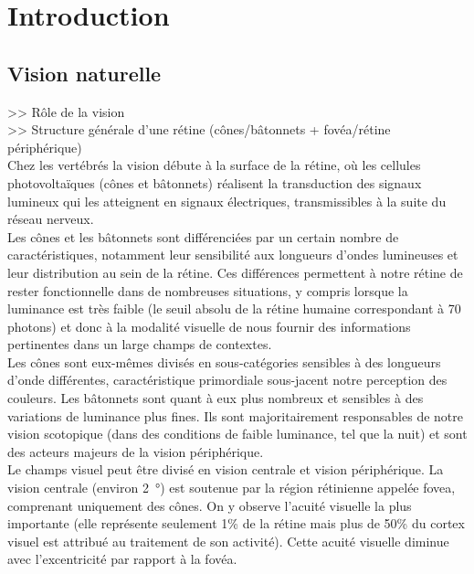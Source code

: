 
\chapter{Introduction} %

\label{Introduction} %


\newcommand{\keyword}[1]{\textbf{#1}}
\newcommand{\tabhead}[1]{\textbf{#1}}
\newcommand{\code}[1]{\texttt{#1}}
\newcommand{\file}[1]{\texttt{\bfseries#1}}
\newcommand{\option}[1]{\texttt{\itshape#1}}


\section{Vision naturelle}
>> Rôle de la vision\\

>> Structure générale d'une rétine (cônes/bâtonnets + fovéa/rétine périphérique)\\
Chez les vertébrés la vision débute à la surface de la rétine, où les cellules photovoltaïques (cônes et bâtonnets) réalisent la transduction des signaux lumineux qui les atteignent en signaux électriques, transmissibles à la suite du réseau nerveux.\\
Les cônes et les bâtonnets sont différenciées par un certain nombre de caractéristiques, notamment leur sensibilité aux longueurs d'ondes lumineuses et leur distribution au sein de la rétine. Ces différences permettent à notre rétine de rester fonctionnelle dans de nombreuses situations, y compris lorsque la luminance est très faible (le seuil absolu de la rétine humaine correspondant à 70 photons) et donc à la modalité visuelle de nous fournir des informations pertinentes dans un large champs de contextes.\\
Les cônes sont eux-mêmes divisés en sous-catégories sensibles à des longueurs d'onde différentes, caractéristique primordiale sous-jacent notre perception des couleurs.
Les bâtonnets sont quant à eux plus nombreux et sensibles à des variations de luminance plus fines. Ils sont majoritairement responsables de notre vision scotopique (dans des conditions de faible luminance, tel que la nuit) et sont des acteurs majeurs de la vision périphérique.\\
Le champs visuel peut être divisé en vision centrale et vision périphérique. La vision centrale (environ \SI{2}{\degree}) est soutenue par la région rétinienne appelée fovea, comprenant uniquement des cônes. On y observe l'acuité visuelle la plus importante (elle représente seulement 1\% de la rétine mais plus de 50\% du cortex visuel est attribué au traitement de son activité). Cette acuité visuelle diminue avec l'excentricité par rapport à la fovéa.

